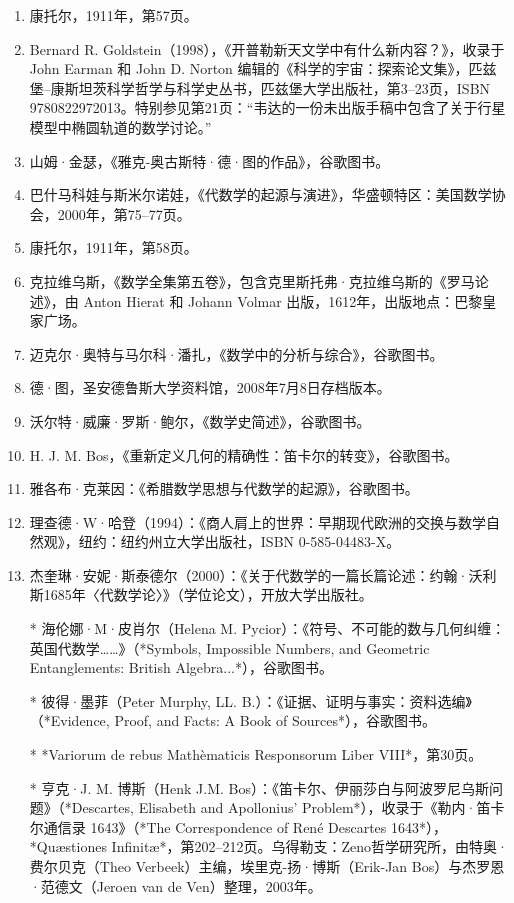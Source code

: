 \begin{enumerate}
\item 康托尔，1911年，第57页。
\item Bernard R. Goldstein（1998），《开普勒新天文学中有什么新内容？》，收录于 John Earman 和 John D. Norton 编辑的《科学的宇宙：探索论文集》，匹兹堡–康斯坦茨科学哲学与科学史丛书，匹兹堡大学出版社，第3–23页，ISBN 9780822972013。特别参见第21页：“韦达的一份未出版手稿中包含了关于行星模型中椭圆轨道的数学讨论。”
\item 山姆·金瑟，《雅克-奥古斯特·德·图的作品》，谷歌图书。
\item 巴什马科娃与斯米尔诺娃，《代数学的起源与演进》，华盛顿特区：美国数学协会，2000年，第75–77页。
\item 康托尔，1911年，第58页。
\item 克拉维乌斯，《数学全集第五卷》，包含克里斯托弗·克拉维乌斯的《罗马论述》，由 Anton Hierat 和 Johann Volmar 出版，1612年，出版地点：巴黎皇家广场。
\item 迈克尔·奥特与马尔科·潘扎，《数学中的分析与综合》，谷歌图书。
\item 德·图，圣安德鲁斯大学资料馆，2008年7月8日存档版本。
\item 沃尔特·威廉·罗斯·鲍尔，《数学史简述》，谷歌图书。
\item H. J. M. Bos，《重新定义几何的精确性：笛卡尔的转变》，谷歌图书。
\item 雅各布·克莱因：《希腊数学思想与代数学的起源》，谷歌图书。
\item 理查德·W·哈登（1994）：《商人肩上的世界：早期现代欧洲的交换与数学自然观》，纽约：纽约州立大学出版社，ISBN 0-585-04483-X。
\item 杰奎琳·安妮·斯泰德尔（2000）：《关于代数学的一篇长篇论述：约翰·沃利斯1685年〈代数学论〉》（学位论文），开放大学出版社。


* 海伦娜·M·皮肖尔（Helena M. Pycior）：《符号、不可能的数与几何纠缠：英国代数学……》（*Symbols, Impossible Numbers, and Geometric Entanglements: British Algebra...*），谷歌图书。

* 彼得·墨菲（Peter Murphy, LL. B.）：《证据、证明与事实：资料选编》（*Evidence, Proof, and Facts: A Book of Sources*），谷歌图书。

* *Variorum de rebus Mathèmaticis Responsorum Liber VIII*，第30页。

* 亨克·J. M. 博斯（Henk J.M. Bos）：《笛卡尔、伊丽莎白与阿波罗尼乌斯问题》（*Descartes, Elisabeth and Apollonius’ Problem*），收录于《勒内·笛卡尔通信录 1643》（*The Correspondence of René Descartes 1643*），*Quæstiones Infinitæ*，第202–212页。乌得勒支：Zeno哲学研究所，由特奥·费尔贝克（Theo Verbeek）主编，埃里克-扬·博斯（Erik-Jan Bos）与杰罗恩·范德文（Jeroen van de Ven）整理，2003年。


\end{enumerate}
